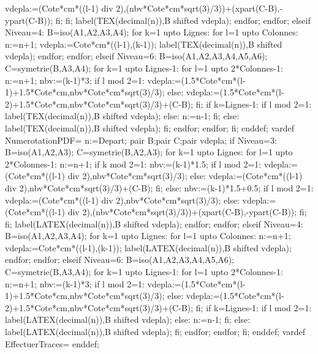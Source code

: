 {        vdepla:=(Cote*cm*((l-1) div 2),(nbv*Cote*cm*sqrt(3)/3))+(xpart(C-B),-ypart(C-B));
        fi;
        fi;
        label(TEX(decimal(n)),B shifted vdepla);
    endfor;
  endfor;
  elseif Niveau=4:
  B=iso(A1,A2,A3,A4);
  for k=1 upto Lignes:
  for l=1 upto Colonnes:
  n:=n+1;
  vdepla:=Cote*cm*((l-1),(k-1));
  label(TEX(decimal(n)),B shifted vdepla);
  endfor;
  endfor;
  elseif Niveau=6:
  B=iso(A1,A2,A3,A4,A5,A6);
  C=symetrie(B,A3,A4);
    for k=1 upto Lignes-1:
      for l=1 upto 2*Colonnes-1:
        n:=n+1;
        nbv:=(k-1)*3;
        if l mod 2=1:
          vdepla:=(1.5*Cote*cm*(l-1)+1.5*Cote*cm,nbv*Cote*cm*sqrt(3)/3);
        else:
          vdepla:=(1.5*Cote*cm*(l-2)+1.5*Cote*cm,nbv*Cote*cm*sqrt(3)/3)+(C-B);
        fi;
        if k=Lignes-1:
        if l mod 2=1:
        label(TEX(decimal(n)),B shifted vdepla);
        else:
        n:=n-1;
        fi;
        else:
        label(TEX(decimal(n)),B shifted vdepla);
        fi;
      endfor;
    endfor;
  fi;
  enddef;
  vardef NumerotationPDF=
  n:=Depart;
  pair B;pair C;pair vdepla;
  if Niveau=3:
    B=iso(A1,A2,A3);
    C=symetrie(B,A2,A3);
    for k=1 upto Lignes:
      for l=1 upto 2*Colonnes-1:
        n:=n+1;
        if k mod 2=1:
        nbv:=(k-1)*1.5;
          if l mod 2=1:
          vdepla:=(Cote*cm*((l-1) div 2),nbv*Cote*cm*sqrt(3)/3);
          else:
          vdepla:=(Cote*cm*((l-1) div 2),nbv*Cote*cm*sqrt(3)/3)+(C-B);
          fi;
          else:
          nbv:=(k-1)*1.5+0.5;
        if l mod 2=1:
        vdepla:=(Cote*cm*((l-1) div 2),nbv*Cote*cm*sqrt(3)/3);
        else:
        vdepla:=(Cote*cm*((l-1) div 2),(nbv*Cote*cm*sqrt(3)/3))+(xpart(C-B),-ypart(C-B));
        fi;
        fi;
        label(LATEX(decimal(n)),B shifted vdepla);
    endfor;
  endfor;
  elseif Niveau=4:
  B=iso(A1,A2,A3,A4);
  for k=1 upto Lignes:
  for l=1 upto Colonnes:
  n:=n+1;
  vdepla:=Cote*cm*((l-1),(k-1));
  label(LATEX(decimal(n)),B shifted vdepla);
  endfor;
  endfor;
  elseif Niveau=6:
  B=iso(A1,A2,A3,A4,A5,A6);
  C=symetrie(B,A3,A4);
    for k=1 upto Lignes-1:
      for l=1 upto 2*Colonnes-1:
        n:=n+1;
        nbv:=(k-1)*3;
        if l mod 2=1:
          vdepla:=(1.5*Cote*cm*(l-1)+1.5*Cote*cm,nbv*Cote*cm*sqrt(3)/3);
        else:
          vdepla:=(1.5*Cote*cm*(l-2)+1.5*Cote*cm,nbv*Cote*cm*sqrt(3)/3)+(C-B);
        fi;
        if k=Lignes-1:
        if l mod 2=1:
        label(LATEX(decimal(n)),B shifted vdepla);
        else:
        n:=n-1;
        fi;
        else:
        label(LATEX(decimal(n)),B shifted vdepla);
        fi;
      endfor;
    endfor;
  fi;
  enddef;
  vardef EffectuerTraces=
  enddef;
}

